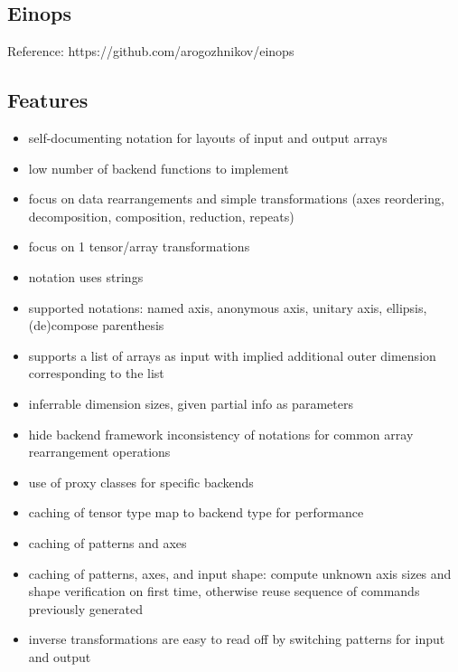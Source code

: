 \documentclass[8pt]{extarticle}
\begin{document}


\begin{multicols*}{2}

  \section{Einops}

  Reference: https://github.com/arogozhnikov/einops
  
  \subsection{Features}
  
  \begin{itemize}
  \item self-documenting notation for layouts of input and output arrays
  \item low number of backend functions to implement
  \item focus on data rearrangements and simple transformations (axes reordering, decomposition, composition, reduction, repeats)
  \item focus on 1 tensor/array transformations
  \item notation uses strings
  \item supported notations: named axis, anonymous axis, unitary axis, ellipsis, (de)compose parenthesis
  \item supports a list of arrays as input with implied additional outer dimension corresponding to the list
  \item inferrable dimension sizes, given partial info as parameters
  \item hide backend framework inconsistency of notations for common array rearrangement operations
  \item use of proxy classes for specific backends
  \item caching of tensor type map to backend type for performance
  \item caching of patterns and axes
  \item caching of patterns, axes, and input shape: compute unknown axis sizes and shape verification on first time, otherwise reuse sequence of commands previously generated
  \item inverse transformations are easy to read off by switching patterns for input and output
  \end{itemize}


\end{multicols*}
\end{document}

